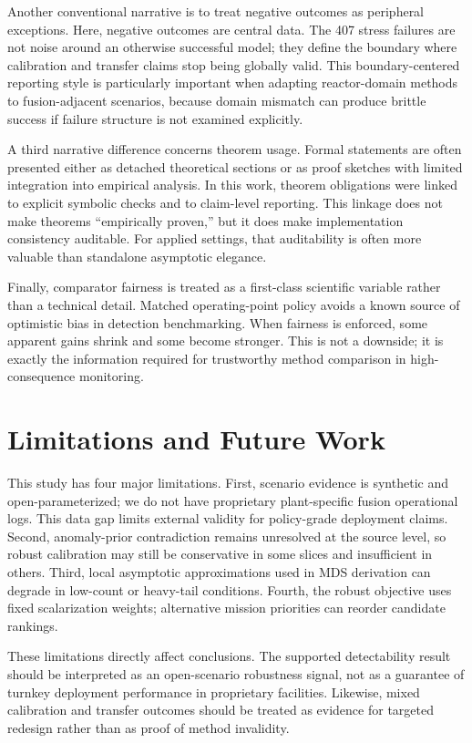 \documentclass{article} %
\begin{document}
Another conventional narrative is to treat negative outcomes as peripheral exceptions. Here, negative outcomes are central data. The 407 stress failures are not noise around an otherwise successful model; they define the boundary where calibration and transfer claims stop being globally valid. This boundary-centered reporting style is particularly important when adapting reactor-domain methods to fusion-adjacent scenarios, because domain mismatch can produce brittle success if failure structure is not examined explicitly.

A third narrative difference concerns theorem usage. Formal statements are often presented either as detached theoretical sections or as proof sketches with limited integration into empirical analysis. In this work, theorem obligations were linked to explicit symbolic checks and to claim-level reporting. This linkage does not make theorems ``empirically proven,'' but it does make implementation consistency auditable. For applied settings, that auditability is often more valuable than standalone asymptotic elegance.

Finally, comparator fairness is treated as a first-class scientific variable rather than a technical detail. Matched operating-point policy avoids a known source of optimistic bias in detection benchmarking. When fairness is enforced, some apparent gains shrink and some become stronger. This is not a downside; it is exactly the information required for trustworthy method comparison in high-consequence monitoring.

\section{Limitations and Future Work}\label{sec:limitations}
This study has four major limitations. First, scenario evidence is synthetic and open-parameterized; we do not have proprietary plant-specific fusion operational logs. This data gap limits external validity for policy-grade deployment claims. Second, anomaly-prior contradiction remains unresolved at the source level, so robust calibration may still be conservative in some slices and insufficient in others. Third, local asymptotic approximations used in MDS derivation can degrade in low-count or heavy-tail conditions. Fourth, the robust objective uses fixed scalarization weights; alternative mission priorities can reorder candidate rankings.

These limitations directly affect conclusions. The supported detectability result should be interpreted as an open-scenario robustness signal, not as a guarantee of turnkey deployment performance in proprietary facilities. Likewise, mixed calibration and transfer outcomes should be treated as evidence for targeted redesign rather than as proof of method invalidity.
\end{document}
